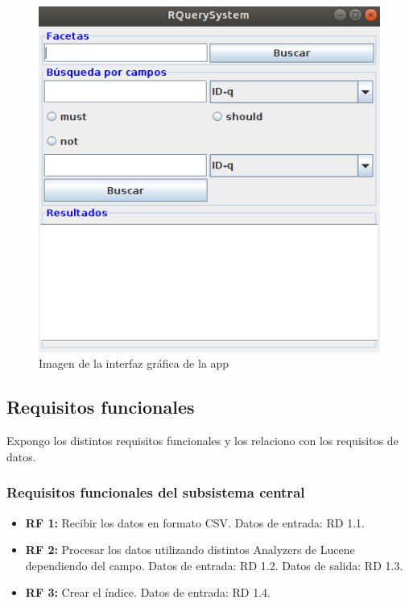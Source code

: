 \begin{figure}[H] %
	\centering
	\includegraphics[scale=0.5]{resultado.png}  %
	\caption{Imagen de la interfaz gráfica de la app} 
\end{figure}


\subsection{Requisitos funcionales}

Expongo los distintos requisitos funcionales y los relaciono con los requisitos de datos.

\subsubsection{Requisitos funcionales del subsistema central}

\begin{itemize}
	\item \textbf{RF 1:} Recibir los datos en formato CSV. Datos de entrada: RD 1.1.
	\item \textbf{RF 2:} Procesar los datos utilizando distintos Analyzers de Lucene dependiendo del campo. Datos de entrada: RD 1.2. Datos de salida: RD 1.3.
	\item \textbf{RF 3:} Crear el índice. Datos de entrada: RD 1.4.
\end{itemize}

